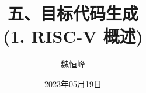 \documentclass[handout]{beamer}
\title[目标代码生成]{五、目标代码生成 \\ (1. RISC-V 概述)}
\author[魏恒峰]{\large 魏恒峰}
\institute{hfwei@nju.edu.cn}
\date{2023年05月19日}
\begin{document}
\maketitle



\thankyou{}

\end{document}
